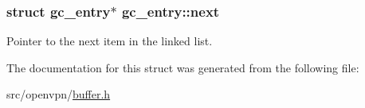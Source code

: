\subsubsection[{next}]{\setlength{\rightskip}{0pt plus 5cm}struct {\bf gc\+\_\+entry}$\ast$ gc\+\_\+entry\+::next}\label{structgc__entry_aaaabb4fc817fb42dbb821979b5981dc3}
Pointer to the next item in the linked list. 

The documentation for this struct was generated from the following file\+:\begin{DoxyCompactItemize}
\item 
src/openvpn/\hyperlink{buffer_8h}{buffer.\+h}\end{DoxyCompactItemize}
